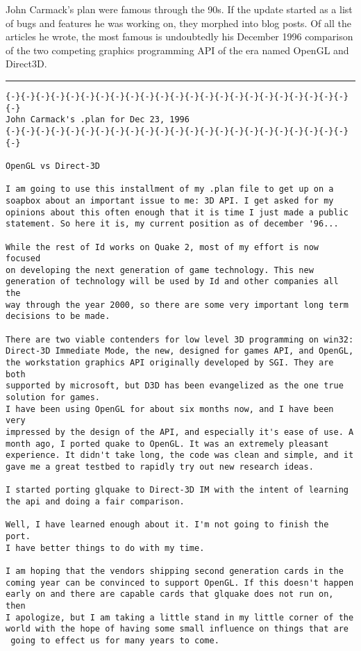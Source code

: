 John Carmack's plan were famous through the 90s. If the update started as a list of bugs and features he was working
on, they morphed into blog posts. Of all the articles he wrote, the most famous is undoubtedly his December 1996 comparison of the two competing graphics programming API of the era named OpenGL and Direct3D.\\
\par
\vspace{10pt}
\label{openglvsdirectd}
\hrule  \par
\begin{verbatim}
{-}{-}{-}{-}{-}{-}{-}{-}{-}{-}{-}{-}{-}{-}{-}{-}{-}{-}{-}{-}{-}{-}{-}{-}
John Carmack's .plan for Dec 23, 1996
{-}{-}{-}{-}{-}{-}{-}{-}{-}{-}{-}{-}{-}{-}{-}{-}{-}{-}{-}{-}{-}{-}{-}{-}

OpenGL vs Direct-3D

I am going to use this installment of my .plan file to get up on a 
soapbox about an important issue to me: 3D API. I get asked for my 
opinions about this often enough that it is time I just made a public 
statement. So here it is, my current position as of december '96... 

While the rest of Id works on Quake 2, most of my effort is now focused 
on developing the next generation of game technology. This new 
generation of technology will be used by Id and other companies all the 
way through the year 2000, so there are some very important long term 
decisions to be made.

There are two viable contenders for low level 3D programming on win32: 
Direct-3D Immediate Mode, the new, designed for games API, and OpenGL, 
the workstation graphics API originally developed by SGI. They are both 
supported by microsoft, but D3D has been evangelized as the one true 
solution for games. 
I have been using OpenGL for about six months now, and I have been very 
impressed by the design of the API, and especially it's ease of use. A 
month ago, I ported quake to OpenGL. It was an extremely pleasant 
experience. It didn't take long, the code was clean and simple, and it 
gave me a great testbed to rapidly try out new research ideas. 

I started porting glquake to Direct-3D IM with the intent of learning 
the api and doing a fair comparison. 

Well, I have learned enough about it. I'm not going to finish the port. 
I have better things to do with my time. 

I am hoping that the vendors shipping second generation cards in the 
coming year can be convinced to support OpenGL. If this doesn't happen 
early on and there are capable cards that glquake does not run on, then 
I apologize, but I am taking a little stand in my little corner of the 
world with the hope of having some small influence on things that are 
 going to effect us for many years to come. 


\end{verbatim}
